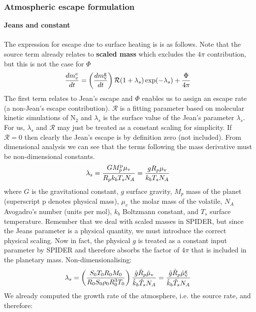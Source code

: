 \subsubsection{Atmospheric escape formulation}
\textbf{Jeans and constant}\\~\\
The expression for escape due to surface heating is \citep[e.g.,][]{JOY15} is as follows.  Note that the source term already relates to \textbf{scaled mass} which excludes the $4 \pi$ contribution, but this is not the case for $\Phi$
\begin{equation}
\frac{d m_v^e}{dt} = \left( \frac{d m_{\rm v}^{\rm g}}{dt} \right) \mathcal{R} (1 + \lambda_s) \exp(-\lambda_s) + \frac{\Phi}{4 \pi}
\end{equation}
The first term relates to Jean's escape and $\Phi$ enables us to assign an escape rate (a non-Jean's escape contribution).  $\mathcal{R}$ is a fitting parameter based on molecular kinetic simulations of N$_2$ \citep{VJT11,VTE11} and $\lambda_s$ is the surface value of the Jean's parameter $\lambda_s$.  For us, $\lambda_s$ and $\mathcal{R}$ may just be treated as a constant scaling for simplicity.  If $\mathcal{R}=0$ then clearly the Jean's escape is by definition zero (not included).  From dimensional analysis we can see that the terms following the mass derivative must be non-dimensional constants.
\begin{equation}
\lambda_s =  \frac{G M_p^{\rm p} \mu_{\rm v}}{R_p k_b T_s N_A} = \frac{g R_p \mu_{\rm v}}{k_b T_s N_A}
\end{equation}
where $G$ is the gravitational constant, $g$ surface gravity, $M_p$ mass of the planet (superscript p denotes physical mass), $\mu_v$ the molar mass of the volatile, $N_A$ Avogadro's number (units per mol), $k_b$ Boltzmann constant, and $T_s$ surface temperature.  Remember that we deal with scaled masses in SPIDER, but since the Jeans parameter is a physical quantity, we must introduce the correct physical scaling.  Now in fact, the physical $g$ is treated as a constant input parameter by SPIDER and therefore absorbs the factor of $4 \pi$ that is included in the planetary mass.  Non-dimensionalising:
\begin{equation}
\lambda_s = \left( \frac{S_0 T_0 R_0 M_0}{R_0 S_0 \rho_0 R_0^3 T_0} \right) \frac{\hat{g} \hat{R}_p \hat{\mu}_{\rm v}}{\hat{k}_b \hat{T}_s N_A} = \frac{\hat{g} \hat{R}_p \hat{\mu}_{\rm v}^{\rm g}}{\hat{k}_b \hat{T}_s N_A}
\end{equation}
We already computed the growth rate of the atmosphere, i.e. the source rate, and therefore:
